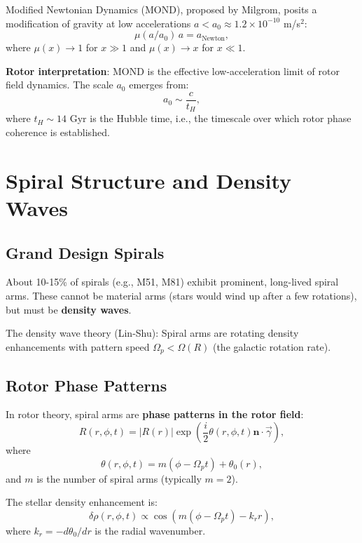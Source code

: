 \documentclass[12pt,a4paper]{article}
\theoremstyle{definition}
\theoremstyle{remark}
\begin{document}
Modified Newtonian Dynamics (MOND), proposed by Milgrom, posits a modification of gravity at low accelerations $a < a_0 \approx 1.2 \times 10^{-10}$ m/s$^2$:
\begin{equation}
\mu(a/a_0) \, a = a_{\text{Newton}},
\end{equation}
where $\mu(x) \to 1$ for $x \gg 1$ and $\mu(x) \to x$ for $x \ll 1$.

\textbf{Rotor interpretation}: MOND is the effective low-acceleration limit of rotor field dynamics. The scale $a_0$ emerges from:
\begin{equation}
a_0 \sim \frac{c}{t_H},
\end{equation}
where $t_H \sim 14$ Gyr is the Hubble time, i.e., the timescale over which rotor phase coherence is established.

\section{Spiral Structure and Density Waves}

\subsection{Grand Design Spirals}

About 10-15\% of spirals (e.g., M51, M81) exhibit prominent, long-lived spiral arms. These cannot be material arms (stars would wind up after a few rotations), but must be \textbf{density waves}.

The density wave theory (Lin-Shu): Spiral arms are rotating density enhancements with pattern speed $\Omega_p < \Omega(R)$ (the galactic rotation rate).

\subsection{Rotor Phase Patterns}

In rotor theory, spiral arms are \textbf{phase patterns in the rotor field}:
\begin{equation}
R(r, \phi, t) = |R(r)| \exp\left(\frac{i}{2} \theta(r, \phi, t) \mathbf{n} \cdot \vec{\gamma}\right),
\end{equation}
where
\begin{equation}
\theta(r, \phi, t) = m(\phi - \Omega_p t) + \theta_0(r),
\end{equation}
and $m$ is the number of spiral arms (typically $m = 2$).

The stellar density enhancement is:
\begin{equation}
\delta \rho(r, \phi, t) \propto \cos\left(m(\phi - \Omega_p t) - k_r r\right),
\end{equation}
where $k_r = -d\theta_0/dr$ is the radial wavenumber.
\end{document}
